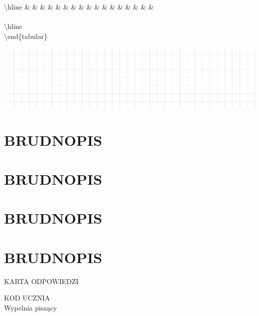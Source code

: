 \documentclass[10pt]{article}
\begin{document}
\textbackslash hline \& \& \& \& \& \& \& \& \& \& \& \& \& \& \& \& \& \\
\\
\textbackslash hline\\
\textbackslash end\{tabular\}

\begin{center}
\includegraphics[max width=\textwidth]{2024_11_21_be8c615186155473dc68g-11(6)}
\end{center}

\section*{BRUDNOPIS}
\section*{BRUDNOPIS}
\section*{BRUDNOPIS}
\section*{BRUDNOPIS}
KARTA ODPOWIEDZI

KOD UCZNIA \(\qquad\)\\
Wypelnia piszący
\end{document}
